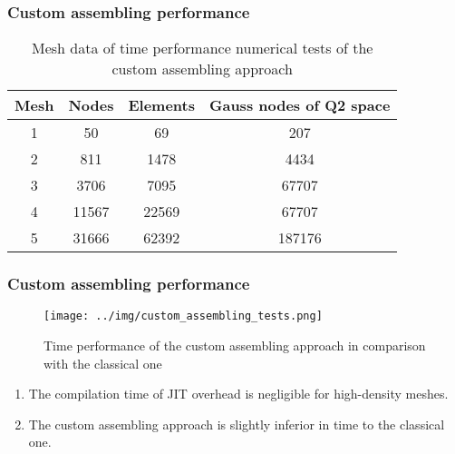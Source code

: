 \documentclass[9pt]{beamer}
\begin{document}


\begin{frame}
  \frametitle{Custom assembling performance}

  \begin{table}[H]
    \centering
    \begin{tabular}{|cccc|}
      \hline
      Mesh & Nodes & Elements & Gauss nodes of Q2 space \\
      \hline
      1 & 50	& 69 & 207 \\
      2 & 811 & 1478 & 4434 \\
      3 & 3706 & 7095 & 67707 \\
      4 & 11567 & 22569 & 67707 \\
      5 & 31666 & 62392 & 187176 \\
      \hline
    \end{tabular}
    \caption{Mesh data of time performance numerical tests of the custom assembling approach}
  \end{table}
\end{frame}

\begin{frame}
  \frametitle{Custom assembling performance}

  \begin{figure}[H]
    \center
    \texttt{[image: ../img/custom\_assembling\_tests.png]}
    \caption{Time performance of the custom assembling approach in comparison with the classical one}
  \end{figure}

  \begin{enumerate}
    \item The compilation time of JIT overhead is negligible for high-density meshes.
    \item The custom assembling approach is slightly inferior in time to the classical one.
  \end{enumerate}

\end{frame}
\end{document}

